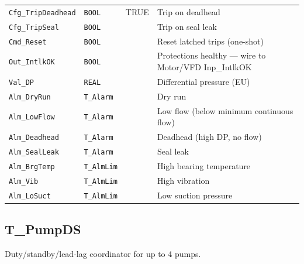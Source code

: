 \begin{small}
\begin{longtable}{@{}P{3.70cm}P{2.20cm}P{1.70cm}P{8.91cm}@{}}
\texttt{Cfg\_TripDeadhead} & \texttt{BOOL} & TRUE & Trip on deadhead \\
\texttt{Cfg\_TripSeal} & \texttt{BOOL} &  & Trip on seal leak \\
\texttt{Cmd\_Reset} & \texttt{BOOL} &  & Reset latched trips (one-shot) \\
\texttt{Out\_IntlkOK} & \texttt{BOOL} &  & Protections healthy --- wire to Motor/\allowbreak{}VFD Inp\_IntlkOK \\
\texttt{Val\_DP} & \texttt{REAL} &  & Differential pressure (EU) \\
\texttt{Alm\_DryRun} & \texttt{T\_Alarm} &  & Dry run \\
\texttt{Alm\_LowFlow} & \texttt{T\_Alarm} &  & Low flow (below minimum continuous flow) \\
\texttt{Alm\_Deadhead} & \texttt{T\_Alarm} &  & Deadhead (high DP, no flow) \\
\texttt{Alm\_SealLeak} & \texttt{T\_Alarm} &  & Seal leak \\
\texttt{Alm\_BrgTemp} & \texttt{T\_AlmLim} &  & High bearing temperature \\
\texttt{Alm\_Vib} & \texttt{T\_AlmLim} &  & High vibration \\
\texttt{Alm\_LoSuct} & \texttt{T\_AlmLim} &  & Low suction pressure \\
\bottomrule
\end{longtable}
\end{small}

\subsection{T\_PumpDS}\label{sec:pclib-t-pumpds}

Duty/\allowbreak{}standby/\allowbreak{}lead-lag coordinator for up to 4 pumps.

\par{}\par

